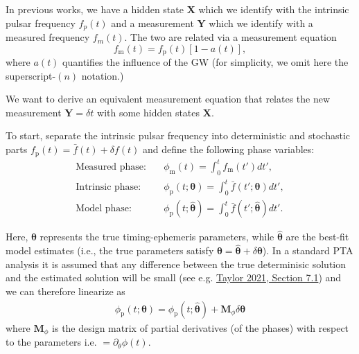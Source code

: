 \documentclass[]{scrartcl}
\begin{document}
In previous works, we have a hidden state $\boldsymbol{X}$ which we identify with the intrinsic pulsar frequency $f_p(t)$ and a measurement  $\boldsymbol{Y}$ which we identify with a measured frequency $f_m(t)$. The two are related via a measurement equation 
\begin{equation}
	f_{\text{m}}(t) = f_{\text{p}}(t) \left[1 - a(t)\right], \label{eq:measurement}
\end{equation}
where $a(t)$ quantifies the influence of the GW (for simplicity, we omit here the superscript-$(n)$ notation.) \newline 

\noindent We want to derive an equivalent measurement equation that relates the new measurement $\boldsymbol{Y} = \delta t$ with some hidden states $\boldsymbol{X}$. \newline 


\noindent To start, separate the intrinsic pulsar frequency into deterministic and stochastic parts $f_{\text{p}}(t) = \bar{f}(t) + \delta f(t)$ and define the following phase variables:
\begin{align}
	\text{Measured phase:} \quad & \phi_{\text{m}}(t) = \int_0^t f_{\text{m}}(t') dt', \label{eq:measured_phase}\\
	\text{Intrinsic phase:} \quad & \phi_{\text{p}}(t;\boldsymbol{\theta}) = \int_0^t \bar{f}(t'; \boldsymbol{\theta}) dt', \label{eq:model_phase} \\
	\text{Model phase:} \quad & \phi_{\text{p}}(t;\boldsymbol{\hat{\theta}}) = \int_0^t \bar{f}(t'; \boldsymbol{\hat{\theta}}) dt'.
\end{align}

Here, $\boldsymbol{\theta}$ represents the true timing-ephemeris parameters, while $\boldsymbol{\hat{\theta}}$ are the best-fit model estimates (i.e., the true parameters satisfy $\boldsymbol{\theta} = \boldsymbol{\hat{\theta}} + \delta \boldsymbol{\theta}$). In a standard PTA analysis it is assumed that any difference between the true determinisic solution and the estimated solution will be small (see e.g. \href{https://arxiv.org/abs/2105.13270}{Taylor 2021, Section 7.1}) and we can therefore linearize as
\begin{eqnarray}
\phi_{\text{p}}(t;\boldsymbol{\theta}) = \phi_{\text{p}}(t;\boldsymbol{\hat{\theta}}) + \mathbf{M}_{\phi} \delta \boldsymbol{\theta} \label{eq:MMatrix}
\end{eqnarray}
where $\mathbf{M}_{\phi}$ is the design matrix of partial derivatives (of the phases) with respect to the parameters i.e. $= \partial_{\theta} \phi(t)$. 
\end{document}
